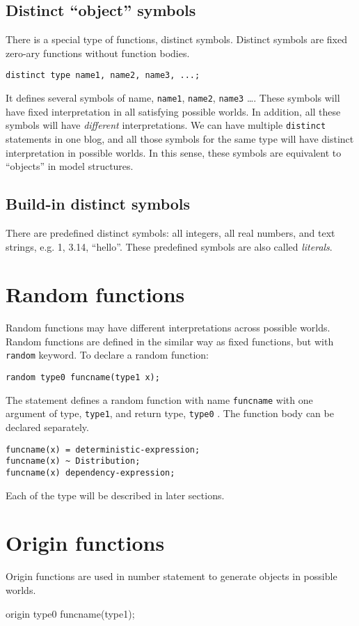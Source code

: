 \documentclass[12pt]{article}
\begin{document}
\subsection{Distinct ``object'' symbols}
There is a special type of functions, distinct symbols. 
Distinct symbols are fixed zero-ary functions without function bodies.
\begin{verbatim}
distinct type name1, name2, name3, ...;
\end{verbatim}
It defines several symbols of name, \texttt{name1}, \texttt{name2}, \texttt{name3} \dots.
These symbols will have fixed interpretation in all satisfying possible worlds. In addition, all these symbols will have \emph{different} interpretations. 
We can have multiple \texttt{distinct} statements in one blog, and all those symbols for the same type will have 
distinct interpretation in possible worlds. In this sense, these symbols are equivalent to ``objects'' in model structures. 

\subsection{Build-in distinct symbols}
There are predefined distinct symbols: all integers, all real numbers, and text strings, e.g. 1, 3.14, ``hello''. These predefined symbols are also called {\em literals}.


\section{Random functions}
Random functions may have different interpretations across possible worlds. Random functions are defined in the similar way as fixed functions, but with \texttt{random} keyword.
To declare a random function:
\begin{verbatim}
random type0 funcname(type1 x);
\end{verbatim}
The statement defines a random function with name \texttt{funcname} with one argument of type, \texttt{type1}, and return type, \texttt{type0} . The function body can be declared separately. 
\begin{verbatim}
funcname(x) = deterministic-expression;
funcname(x) ~ Distribution;
funcname(x) dependency-expression;
\end{verbatim}
 Each of the type will be described in later sections.


\section{Origin functions}
Origin functions are used in number statement to generate objects in possible worlds. 
\begin{blog}
origin type0 funcname(type1);
\end{blog}
\end{document}
